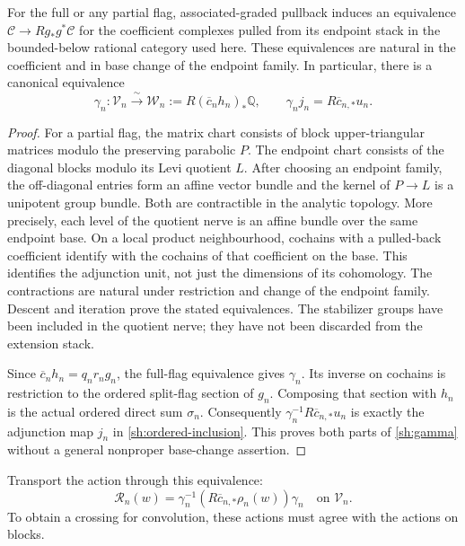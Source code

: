 \begin{lemma}\label{sh:associated-graded}
For the full or any partial flag, associated-graded pullback
induces an equivalence
$\mathcal C\to Rg_*g^*\mathcal C$ for the coefficient complexes
pulled from its endpoint stack in the bounded-below rational
category used here. These equivalences are natural in the
coefficient and in base change of the endpoint family.
In particular, there is a canonical equivalence
\begin{equation}\label{sh:gamma}
 \gamma_n:\mathcal V_n\xrightarrow{\ \sim\ }
 \mathcal W_n:=R(\overline c_n h_n)_*\mathbb Q,
 \qquad
 \gamma_n j_n=R\overline c_{n,*}u_n.
\end{equation}
\end{lemma}
\begin{proof}
For a partial flag, the matrix chart consists of block
upper-triangular matrices modulo the preserving parabolic $P$.
The endpoint chart consists of the diagonal blocks modulo its
Levi quotient $L$. After choosing an endpoint family, the
off-diagonal entries form an affine vector bundle and the kernel
of $P\to L$ is a unipotent group bundle. Both are contractible
in the analytic topology. More precisely, each level of the
quotient nerve is an affine bundle over the same endpoint base.
On a local product neighbourhood, cochains with a pulled-back
coefficient identify with the cochains of that coefficient on
the base. This identifies the adjunction unit, not just the
dimensions of its cohomology. The contractions are natural under
restriction and change of the endpoint family. Descent and
iteration prove the stated equivalences. The stabilizer groups
have been included in the quotient nerve; they have not been
discarded from the extension stack.

Since $\overline c_nh_n=q_nr_ng_n$, the full-flag equivalence
gives $\gamma_n$. Its inverse on cochains is restriction to the
ordered split-flag section of $g_n$. Composing that section with
$h_n$ is the actual ordered direct sum $\sigma_n$.
Consequently $\gamma_n^{-1}R\overline c_{n,*}u_n$ is exactly
the adjunction map $j_n$ in \eqref{sh:ordered-inclusion}.
This proves both parts of \eqref{sh:gamma} without a general
nonproper base-change assertion.
\end{proof}

Transport the action through this equivalence:
\[
 \mathcal R_n(w)=\gamma_n^{-1}
          (R\overline c_{n,*}\rho_n(w))\gamma_n
       \quad\text{on }\mathcal V_n.
\]
To obtain a crossing for convolution, these actions must agree
with the actions on blocks.

